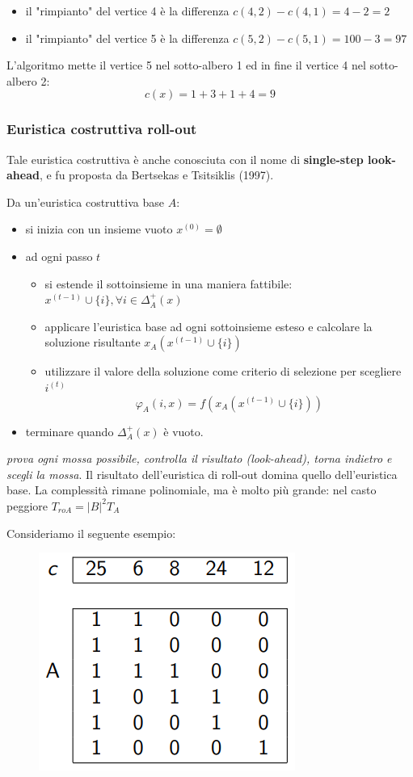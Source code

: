 \documentclass{article}
\begin{document}
    \begin{itemize}
        \item il "rimpianto" del vertice 4 è la differenza $c(4,2)-c(4,1)=4-2=2$
        \item il "rimpianto" del vertice 5 è la differenza $c(5,2)-c(5,1)=100-3=97$
    \end{itemize}
    L'algoritmo mette il vertice 5 nel sotto-albero 1 ed in fine il vertice 4 nel sotto-albero 2:
    $$c(x)=1+3+1+4=9$$

    \subsubsection{Euristica costruttiva roll-out}
    Tale euristica costruttiva è anche conosciuta con il nome di \textbf{single-step look-ahead}, e
    fu proposta da Bertsekas e Tsitsiklis (1997).

    Da un'euristica costruttiva base $A$:
    \begin{itemize}
        \item si inizia con un insieme vuoto $x^{(0)}=\emptyset$
        \item ad ogni passo $t$
              \begin{itemize}
                  \item si estende il sottoinsieme in una maniera fattibile: $x^{(t-1)}\cup\{i\},\forall i\in\Delta_A^+(x)$
                  \item applicare l'euristica base ad ogni sottoinsieme esteso e calcolare la soluzione risultante
                        $x_A(x^{(t-1)}\cup\{i\})$
                  \item utilizzare il valore della soluzione come criterio di selezione per scegliere $i^{(t)}$
                        $$\varphi_A(i,x)=f(x_A(x^{(t-1)}\cup\{i\}))$$
              \end{itemize}
        \item terminare quando $\Delta_A^+(x)$ è vuoto.
    \end{itemize}
    \textit{prova ogni mossa possibile, controlla il risultato (look-ahead), torna indietro e scegli la mossa}.
    Il risultato dell'euristica di roll-out domina quello dell'euristica base. La complessità
    rimane polinomiale, ma è molto più grande: nel casto peggiore $T_{roA}=|B|^2 T_A$

Consideriamo il seguente esempio:
\begin{figure}[H]
    \centering
    \includegraphics[scale=0.7]{images/scp_ro.png}
\end{figure}
\end{document}
